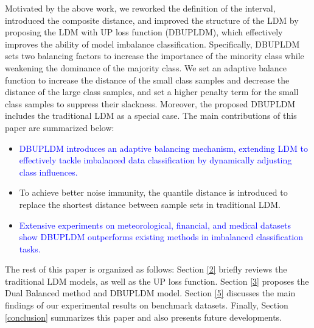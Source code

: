 \documentclass[a4paper]{cas-sc}
\begin{document}
Motivated by the above work, we reworked the definition of the interval, introduced the composite distance, and improved the structure of the LDM by proposing the LDM with UP loss function (DBUPLDM), which effectively improves the ability of model imbalance classification. Specifically, DBUPLDM sets two balancing factors to increase the importance of the minority class while weakening the dominance of the majority class. We set an adaptive balance function to increase the distance of the small class samples and decrease the distance of the large class samples, and set a higher penalty term for the small class samples to suppress their slackness. Moreover, the proposed DBUPLDM includes the traditional LDM as a special case.  
The main contributions of this paper are summarized below:
\begin{itemize}
    \item [$\bullet$]\textcolor{blue}{DBUPLDM introduces an adaptive balancing mechanism, extending LDM to effectively tackle imbalanced data classification by dynamically adjusting class influences.} 
    \item [$\bullet$] To achieve better noise immunity, the quantile distance is introduced to replace the shortest distance between
 sample sets in traditional LDM.
    \item [$\bullet$] \textcolor{blue}{Extensive experiments on meteorological, financial, and medical datasets show DBUPLDM outperforms existing methods in imbalanced classification tasks.}
\end{itemize}

The rest of this paper is organized as follows: Section \ref{2} briefly reviews the traditional LDM models, as well as the UP loss function. Section \ref{3} proposes the Dual Balanced method and DBUPLDM model. Section \ref{5} discusses the main findings of our experimental results on benchmark datasets. Finally, Section \ref{conclusion} summarizes this paper and also presents future developments.
\end{document}
